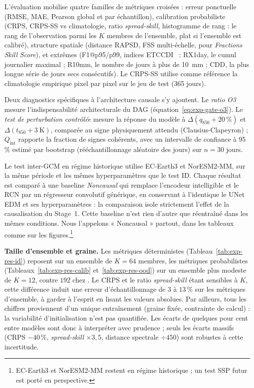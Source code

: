 L'évaluation mobilise quatre familles de métriques croisées : erreur ponctuelle (RMSE, MAE, Pearson global et par échantillon), calibration probabiliste (CRPS, CRPS-SS vs climatologie, ratio \emph{spread-skill}, histogramme de rang : le rang de l'observation parmi les $K$ membres de l'ensemble, plat si l'ensemble est calibré), structure spatiale (distance RAPSD, FSS multi-échelle, pour \emph{Fractions Skill Score}), et extrêmes (F1@p95/p99, indices ETCCDI~\cite{zhang_etccdi_2011} : RX1day, le cumul journalier maximal ; R10mm, le nombre de jours à plus de 10~mm ; CDD, la plus longue série de jours secs consécutifs). Le CRPS-SS utilise comme référence la climatologie empirique pixel par pixel sur le jeu de test (365 jours).

Deux diagnostics spécifiques à l'architecture causale s'y ajoutent. Le \emph{ratio O3} mesure l'indispensabilité architecturale du DAG (équation~\ref{eq:exp-gate-o3}). Le \emph{test de perturbation contrôlée} mesure la réponse du modèle à $\Delta(q_{850} +20\,\%)$ et $\Delta(t_{850} +3~\mathrm{K})$, comparée au signe physiquement attendu (Clausius-Clapeyron) ; $Q_{\mathrm{int}}$ rapporte la fraction de signes cohérents, avec un intervalle de confiance à 95\,\% estimé par bootstrap (rééchantillonnage aléatoire des jours) sur $n=30$ jours.

Le test inter-GCM en régime historique utilise EC-Earth3 et NorESM2-MM, sur la même période et les mêmes hyperparamètres que le test ID. Chaque résultat est comparé à une baseline \emph{Noncausal} qui remplace l'encodeur intelligible et le RCN par un régresseur convolutif générique, en conservant à l'identique le UNet EDM et ses hyperparamètres : la comparaison isole strictement l'effet de la causalisation du Stage~1. Cette baseline n'est rien d'autre que \CorrDiff{} réentraîné dans les mêmes conditions. Nous l'appelons « Noncausal » partout, dans les tableaux comme sur les figures.\footnote{EC-Earth3 et NorESM2-MM restent en régime historique ; un test SSP futur est porté en perspective.}

\textbf{Taille d'ensemble et graine.} Les métriques déterministes (Tableau~\ref{tab:exp-res-id}) reposent sur un ensemble de $K=64$ membres, les métriques probabilistes (Tableaux~\ref{tab:exp-res-calib} et~\ref{tab:exp-res-ood}) sur un ensemble plus modeste de $K=12$, contre $192$ chez \CorrDiff{}. Le CRPS et le ratio \emph{spread-skill} étant sensibles à $K$, cette différence induit une erreur d'échantillonnage de $3$ à $13\,\%$ sur les métriques d'ensemble, à garder à l'esprit en lisant les valeurs absolues. Par ailleurs, tous les chiffres proviennent d'un unique entraînement (graine fixée, contrainte de calcul) : la variabilité d'initialisation n'est pas quantifiée. Les écarts de quelques pour cent entre modèles sont donc à interpréter avec prudence ; seuls les écarts massifs (CRPS $-40\,\%$, \emph{spread-skill} $\times 3{,}5$, distance spectrale $\div 450$) sont robustes à cette incertitude.

